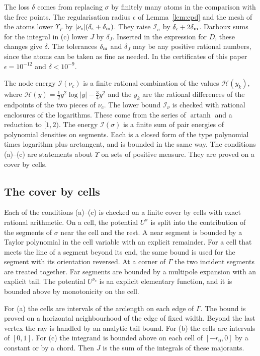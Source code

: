 \documentclass[11pt]{amsart}
\theoremstyle{definition}
\theoremstyle{remark}
\numberwithin{equation}{section}
\newcommand{\cI}{\mathcal I}
\begin{document}
The loss $\delta$ comes from replacing $\sigma$ by finitely many atoms in the comparison with the free points. The
regularisation radius $\epsilon$ of Lemma~\ref{lem:cpd} and the mesh of the atoms lower $\Upsilon_\Gamma$ by
$|\nu_c|(\delta_\epsilon+\delta_{\rm m})$. They raise $\cI_\sigma$ by $\delta_\epsilon+2\delta_{\rm m}$. Darboux sums for the
integral in (c) lower $J$ by $\delta_J$. Inserted in the expression for $D$, these changes give $\delta$. The tolerances
$\delta_{\rm m}$ and $\delta_J$ may be any positive rational numbers, since the atoms can be taken as fine as needed. In
the certificates of this paper $\epsilon=10^{-12}$ and $\delta<10^{-9}$.

The node energy $\cI(\nu_c)$ is a finite rational combination of the values $\mathcal H(y_k)$, where
$\mathcal H(y)=\frac12y^2\log|y|-\frac34y^2$ and the $y_k$ are the rational differences of the endpoints of the two pieces
of $\nu_c$. The lower bound $\cI_\nu$ is checked with rational enclosures of the logarithms. These come from the series of
$\operatorname{artanh}$ and a reduction to $[1,2)$. The energy $\cI(\sigma)$ is a finite sum of pair energies of
polynomial densities on segments. Each is a closed form of the type polynomial times logarithm plus arctangent, and is
bounded in the same way. The conditions (a)--(c) are statements about $\Upsilon$ on sets of positive measure. They are
proved on a cover by cells.

\subsection{The cover by cells}\label{ssec:slope-cert}
Each of the conditions (a)--(c) is checked on a finite cover by cells with exact rational arithmetic. On a cell, the
potential $U^\sigma$ is split into the contribution of the segments of $\sigma$ near the cell and the rest. A near segment
is bounded by a Taylor polynomial in the cell variable with an explicit remainder. For a cell that meets the line of a
segment beyond its end, the same bound is used for the segment with its orientation reversed. At a corner of $\Gamma$ the
two incident segments are treated together. Far segments are bounded by a multipole expansion with an explicit tail. The
potential $U^{\nu_c}$ is an explicit elementary function, and it is bounded above by monotonicity on the cell.

For (a) the cells are intervals of the arclength on each edge of $\Gamma$. The bound is proved on a horizontal
neighbourhood of the edge of fixed width. Beyond the last vertex the ray is handled by an analytic tail bound. For (b)
the cells are intervals of $[0,1]$. For (c) the integrand is bounded above on each cell of $[-r_0,0]$ by a constant or by
a chord. Then $J$ is the sum of the integrals of these majorants.
\end{document}
